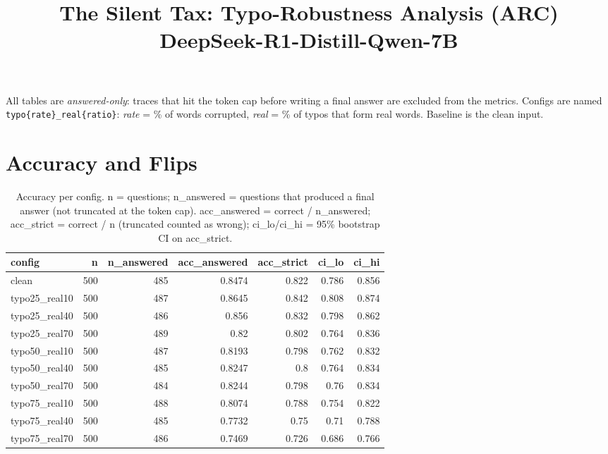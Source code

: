 \documentclass[11pt]{article}
\title{The Silent Tax: Typo-Robustness Analysis (ARC)\\\large DeepSeek-R1-Distill-Qwen-7B}
\date{}
\begin{document}
\maketitle
\noindent All tables are \emph{answered-only}: traces that hit the token cap before writing a final answer are excluded from the metrics. Configs are named \texttt{typo\{rate\}\_real\{ratio\}}: \emph{rate} = \% of words corrupted, \emph{real} = \% of typos that form real words. Baseline is the clean input.

\section*{Accuracy and Flips}
\begin{table}[H]
\centering
\caption{Accuracy per config. n = questions; n\_answered = questions that produced a final answer (not truncated at the token cap). acc\_answered = correct / n\_answered; acc\_strict = correct / n (truncated counted as wrong); ci\_lo/ci\_hi = 95\% bootstrap CI on acc\_strict.}
\small
\begin{adjustbox}{max width=\textwidth}
\begin{tabular}{lrrrrrr}
\toprule
\textbf{config} & \textbf{n} & \textbf{n\_answered} & \textbf{acc\_answered} & \textbf{acc\_strict} & \textbf{ci\_lo} & \textbf{ci\_hi} \\
\midrule
clean & 500 & 485 & 0.8474 & 0.822 & 0.786 & 0.856 \\
typo25\_real10 & 500 & 487 & 0.8645 & 0.842 & 0.808 & 0.874 \\
typo25\_real40 & 500 & 486 & 0.856 & 0.832 & 0.798 & 0.862 \\
typo25\_real70 & 500 & 489 & 0.82 & 0.802 & 0.764 & 0.836 \\
typo50\_real10 & 500 & 487 & 0.8193 & 0.798 & 0.762 & 0.832 \\
typo50\_real40 & 500 & 485 & 0.8247 & 0.8 & 0.764 & 0.834 \\
typo50\_real70 & 500 & 484 & 0.8244 & 0.798 & 0.76 & 0.834 \\
typo75\_real10 & 500 & 488 & 0.8074 & 0.788 & 0.754 & 0.822 \\
typo75\_real40 & 500 & 485 & 0.7732 & 0.75 & 0.71 & 0.788 \\
typo75\_real70 & 500 & 486 & 0.7469 & 0.726 & 0.686 & 0.766 \\
\bottomrule
\end{tabular}
\end{adjustbox}
\end{table}
\end{document}

